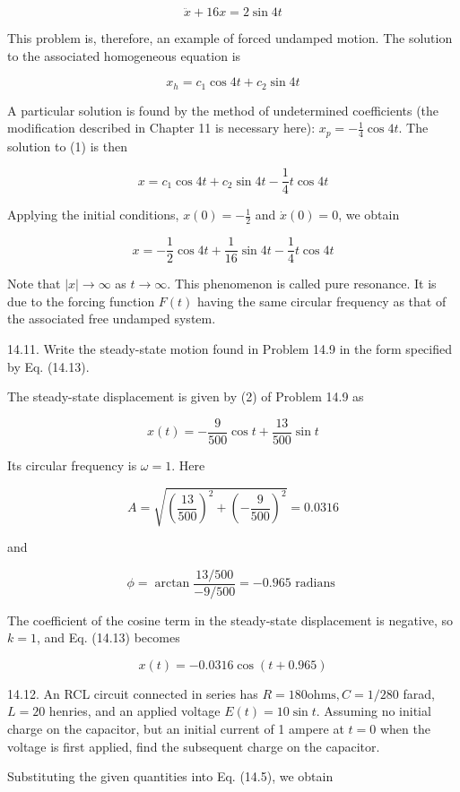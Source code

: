\documentclass[10pt]{article}
\begin{document}
\begin{equation*}
\ddot{x}+16 x=2 \sin 4 t \tag{1}
\end{equation*}


This problem is, therefore, an example of forced undamped motion. The solution to the associated homogeneous equation is

$$
x_{h}=c_{1} \cos 4 t+c_{2} \sin 4 t
$$

A particular solution is found by the method of undetermined coefficients (the modification described in Chapter 11 is necessary here): $x_{p}=-\frac{1}{4} \cos 4 t$. The solution to (1) is then

$$
x=c_{1} \cos 4 t+c_{2} \sin 4 t-\frac{1}{4} t \cos 4 t
$$

Applying the initial conditions, $x(0)=-\frac{1}{2}$ and $\dot{x}(0)=0$, we obtain

$$
x=-\frac{1}{2} \cos 4 t+\frac{1}{16} \sin 4 t-\frac{1}{4} t \cos 4 t
$$

Note that $|x| \rightarrow \infty$ as $t \rightarrow \infty$. This phenomenon is called pure resonance. It is due to the forcing function $F(t)$ having the same circular frequency as that of the associated free undamped system.

14.11. Write the steady-state motion found in Problem 14.9 in the form specified by Eq. (14.13).

The steady-state displacement is given by (2) of Problem 14.9 as

$$
x(t)=-\frac{9}{500} \cos t+\frac{13}{500} \sin t
$$

Its circular frequency is $\omega=1$. Here

$$
A=\sqrt{\left(\frac{13}{500}\right)^{2}+\left(-\frac{9}{500}\right)^{2}}=0.0316
$$

and

$$
\phi=\arctan \frac{13 / 500}{-9 / 500}=-0.965 \text { radians }
$$

The coefficient of the cosine term in the steady-state displacement is negative, so $k=1$, and Eq. (14.13) becomes

$$
x(t)=-0.0316 \cos (t+0.965)
$$

14.12. An RCL circuit connected in series has $R=180 \mathrm{ohms}, C=1 / 280$ farad, $L=20$ henries, and an applied voltage $E(t)=10 \sin t$. Assuming no initial charge on the capacitor, but an initial current of 1 ampere at $t=0$ when the voltage is first applied, find the subsequent charge on the capacitor.

Substituting the given quantities into Eq. (14.5), we obtain
\end{document}
